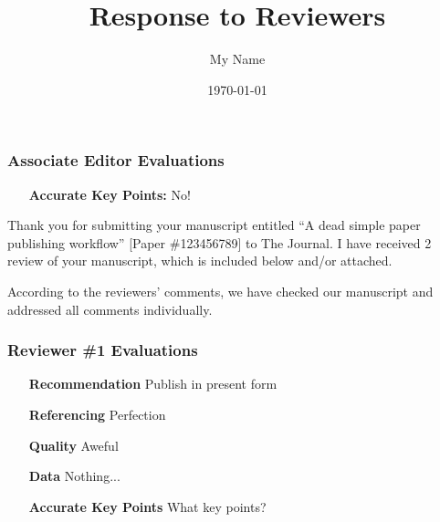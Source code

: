 \documentclass{reviewresponse}
\begin{document}
\title{Response to Reviewers}
\author{My Name}
\date{\today}
\maketitle

\editor %
\subsubsection*{Associate Editor Evaluations}
\begin{evaluation}
  \begin{itemize}[leftmargin=4.5cm,noitemsep]
    \item
      [\textbf{Accurate Key Points:}] No!
  \end{itemize}
\end{evaluation}
{
  \begin{generalcomment}
    Thank you for submitting your manuscript entitled ``A dead simple paper publishing workflow'' [Paper \#123456789] to The Journal. I have received 2 review of your manuscript, which is included below and/or attached.
  \end{generalcomment}
  \begin{revresponse}
    According to the reviewers' comments, we have checked our manuscript and addressed all comments individually.
  \end{revresponse}
}

\reviewer

\subsubsection*{Reviewer \#1 Evaluations}

\begin{evaluation}
  \begin{itemize}[leftmargin=4.5cm,noitemsep]
    \item
      [\textbf{Recommendation}] Publish in present form
    \item
      [\textbf{Referencing}] Perfection
    \item
      [\textbf{Quality}] Aweful
    \item
      [\textbf{Data}] Nothing...
    \item
      [\textbf{Accurate Key Points}] What key points?
  \end{itemize}
\end{evaluation}
\end{document}
